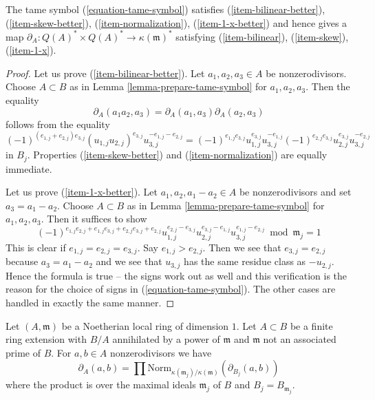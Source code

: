 \begin{lemma}
\label{lemma-tame-symbol}
The tame symbol (\ref{equation-tame-symbol}) satisfies
(\ref{item-bilinear-better}), (\ref{item-skew-better}),
(\ref{item-normalization}), (\ref{item-1-x-better}) and hence
gives a map $\partial_A : Q(A)^* \times Q(A)^* \to \kappa(\mathfrak m)^*$
satisfying (\ref{item-bilinear}), (\ref{item-skew}), (\ref{item-1-x}).
\end{lemma}

\begin{proof}
Let us prove (\ref{item-bilinear-better}).
Let $a_1, a_2, a_3 \in A$ be nonzerodivisors.
Choose $A \subset B$ as in Lemma \ref{lemma-prepare-tame-symbol}
for $a_1, a_2, a_3$. Then the equality
$$
\partial_A(a_1a_2, a_3) = \partial_A(a_1, a_3) \partial_A(a_2, a_3)
$$
follows from the equality
$$
(-1)^{(e_{1, j} + e_{2, j})e_{3, j}}
(u_{1, j}u_{2, j})^{e_{3, j}}u_{3, j}^{-e_{1, j} - e_{2, j}} =
(-1)^{e_{1, j}e_{3, j}}
u_{1, j}^{e_{3, j}}u_{3, j}^{-e_{1, j}}
(-1)^{e_{2, j}e_{3, j}}
u_{2, j}^{e_{3, j}}u_{3, j}^{-e_{2, j}}
$$
in $B_j$. Properties (\ref{item-skew-better}) and
(\ref{item-normalization}) are equally immediate.

\medskip\noindent
Let us prove (\ref{item-1-x-better}). Let $a_1, a_2, a_1 - a_2 \in A$
be nonzerodivisors and set $a_3 = a_1 - a_2$.
Choose $A \subset B$ as in Lemma \ref{lemma-prepare-tame-symbol}
for $a_1, a_2, a_3$. Then it suffices to show
$$
(-1)^{e_{1, j}e_{2, j} + e_{1, j}e_{3, j} + e_{2, j}e_{3, j} + e_{2, j}}
u_{1, j}^{e_{2, j} - e_{3, j}}
u_{2, j}^{e_{3, j} - e_{1, j}}
u_{3, j}^{e_{1, j} - e_{2, j}} \bmod \mathfrak m_j = 1
$$
This is clear if $e_{1, j} = e_{2, j} = e_{3, j}$.
Say $e_{1, j} > e_{2, j}$. Then we see that $e_{3, j} = e_{2, j}$
because $a_3 = a_1 - a_2$ and we see that $u_{3, j}$
has the same residue class as $-u_{2, j}$. Hence
the formula is true -- the signs work out as well
and this verification is the reason for the choice of signs
in (\ref{equation-tame-symbol}).
The other cases are handled in exactly the same manner.
\end{proof}

\begin{lemma}
\label{lemma-norm-down-tame-symbol}
Let $(A, \mathfrak m)$ be a Noetherian local ring of dimension $1$.
Let $A \subset B$ be a finite ring extension with $B/A$
annihilated by a power of $\mathfrak m$ and $\mathfrak m$ not
an associated prime of $B$.
For $a, b \in A$ nonzerodivisors we have
$$
\partial_A(a, b) = \prod
\text{Norm}_{\kappa(\mathfrak m_j)/\kappa(\mathfrak m)}(\partial_{B_j}(a, b))
$$
where the product is over the maximal ideals $\mathfrak m_j$ of $B$
and $B_j = B_{\mathfrak m_j}$.
\end{lemma}

